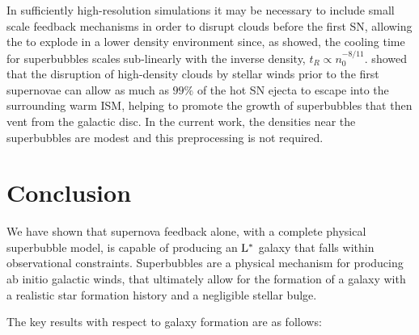 In sufficiently high-resolution simulations it may be necessary to include small
scale feedback mechanisms in order to disrupt clouds before the first SN,
allowing the to explode in a lower density environment since, as
\citet{MacLow1988} showed, the cooling time for superbubbles scales sub-linearly
with the inverse density, $t_R\propto n_0^{-8/11}$.  \citet{Rogers2013} showed
that the disruption of high-density clouds by stellar winds prior to the first
supernovae can allow as much as $99\%$ of the hot SN ejecta to escape into the
surrounding warm ISM, helping to promote the growth of superbubbles that then
vent from the galactic disc.  In the current work, the densities near the
superbubbles are modest and this preprocessing is not required.

\section{Conclusion}

We have shown that supernova feedback alone, with a complete physical
superbubble model, is capable of producing an $\rm{L^*}$ galaxy that falls
within observational constraints.  Superbubbles are a physical mechanism for
producing ab initio galactic winds, that ultimately allow for the formation of a
galaxy with a realistic star formation history and a negligible stellar bulge.

The key results with respect to galaxy formation are as follows:

